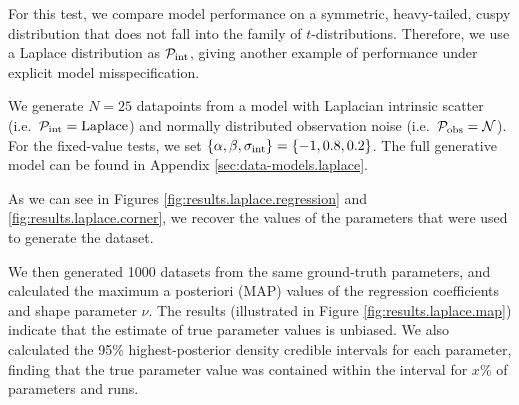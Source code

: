 \documentclass[fleqn,usenatbib]{mnras}
\begin{document}
For this test, we compare model performance on a symmetric, heavy-tailed, cuspy
distribution that does not fall into the family of $t$-distributions. Therefore,
we use a Laplace distribution as $\mathcal P_{\rm int}$, giving another example
of performance under explicit model misspecification.

We generate $N = 25$ datapoints from a model with Laplacian intrinsic scatter
(i.e.\ $\mathcal P_{\rm int} = \mathrm{Laplace}$) and normally distributed observation
noise (i.e.\ $\mathcal P_{\rm obs} = \mathcal N$). For the fixed-value tests, we
set $\{\alpha, \beta, \sigma_{\rm int}\} = \{-1, 0.8, 0.2\}$. The full
generative model can be found in Appendix \ref{sec:data-models.laplace}.



As we can see in Figures \ref{fig:results.laplace.regression} and
\ref{fig:results.laplace.corner}, we recover the values of the parameters that were
used to generate the dataset.

We then generated 1000 datasets from the same ground-truth parameters, and
calculated the maximum a posteriori (MAP) values of the regression coefficients
and shape parameter $\nu$. The results (illustrated in Figure
\ref{fig:results.laplace.map}) indicate that the estimate of true parameter
values is unbiased.{ \color{red} We also calculated the 95\% highest-posterior
density credible intervals for each parameter, finding that the true parameter
value was contained within the interval for $x$\% of parameters and runs.  }

\end{document}
